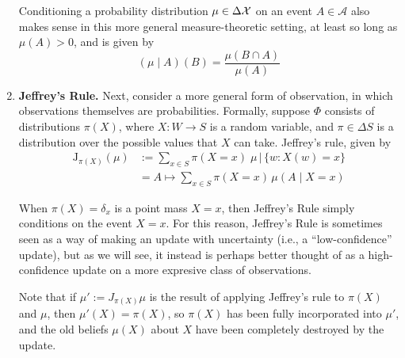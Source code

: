 \documentclass{article}
\begin{document}
\begin{enumerate}
{    

    Conditioning a probability distribution $\mu \in \Delta\mathcal X$ on an event $A \in \mathcal A$ also makes sense in this more general measure-theoretic setting, at least so long as $\mu(A) > 0$, and is given by
    $$
        (\mu \mid A) (B) = \frac{\mu(B \cap A)}{\mu(A)}
    $$
    }


    \item \textbf{Jeffrey's Rule.}
    Next, consider a more general form of observation, in which observations themselves are probabilities. 
    Formally, suppose $\Phi$ consists of distributions $\pi(X)$,
    where $X : W \to S$ is a random variable,
    and $\pi \in \Delta S$ is a distribution over the possible values that $X$ can take.
    Jeffrey's rule, given by
    \begin{align*}
        \mathrm{J}_{\pi(X)}
        (\mu) &:= \sum_{x \in S} \pi(X\!=x) \;  \mu \,\Big|\, \{ w : X(w) = x \}
            \\
            &= A \mapsto \sum_{x \in S} \pi(X\!=x)\, \mu( A \mid X \!= x)
    \end{align*}

    When $\pi(X) = \delta_x$ is a point mass $X=x$, then Jeffrey's Rule simply conditions on the event $X = x$.
    For this reason, Jeffrey's Rule is sometimes seen as a way of making an update with uncertainty (i.e., a ``low-confidence'' update), but as we will see, it instead is perhaps better thought of as a high-confidence update on a more expresive class of observations.
    
    Note that if $\mu' := J_{\pi(X)}\mu$ is the result of applying Jeffrey's rule to $\pi(X)$ and $\mu$, 
    then $\mu'(X) = \pi(X)$, so $\pi(X)$ has been fully incorporated into $\mu'$, and the old beliefs $\mu(X)$ about $X$ have been completely destroyed by the update.
\end{enumerate}
\end{document}
